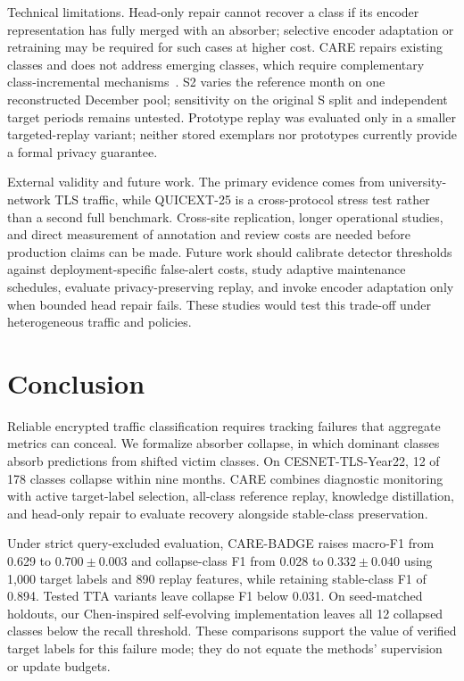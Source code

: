 \documentclass[preprint,12pt,authoryear]{elsarticle}
\let\cite\citep
\newcommand{\ours}{CARE}  %
\begin{document}
Technical limitations.
Head-only repair cannot recover a class if its encoder representation has fully merged with an absorber; selective encoder adaptation or retraining may be required for such cases at higher cost. \ours{} repairs existing classes and does not address emerging classes, which require complementary class-incremental mechanisms~\cite{cai2024cpn}. S2 varies the reference month on one reconstructed December pool; sensitivity on the original S split and independent target periods remains untested. Prototype replay was evaluated only in a smaller targeted-replay variant; neither stored exemplars nor prototypes currently provide a formal privacy guarantee.

External validity and future work.
The primary evidence comes from university-network TLS traffic, while QUICEXT-25 is a cross-protocol stress test rather than a second full benchmark. Cross-site replication, longer operational studies, and direct measurement of annotation and review costs are needed before production claims can be made. Future work should calibrate detector thresholds against deployment-specific false-alert costs, study adaptive maintenance schedules, evaluate privacy-preserving replay, and invoke encoder adaptation only when bounded head repair fails. These studies would test this trade-off under heterogeneous traffic and policies.


\section{Conclusion}
\label{sec:conclusion}

Reliable encrypted traffic classification requires tracking failures that aggregate metrics can conceal. We formalize absorber collapse, in which dominant classes absorb predictions from shifted victim classes. On CESNET-TLS-Year22, 12 of 178 classes collapse within nine months. \ours{} combines diagnostic monitoring with active target-label selection, all-class reference replay, knowledge distillation, and head-only repair to evaluate recovery alongside stable-class preservation.

Under strict query-excluded evaluation, \ours{}-BADGE raises macro-F1 from 0.629 to $0.700{\pm}0.003$ and collapse-class F1 from 0.028 to $0.332{\pm}0.040$ using 1{,}000 target labels and 890 replay features, while retaining stable-class F1 of 0.894. Tested TTA variants leave collapse F1 below 0.031. On seed-matched holdouts, our Chen-inspired self-evolving implementation leaves all 12 collapsed classes below the recall threshold. These comparisons support the value of verified target labels for this failure mode; they do not equate the methods' supervision or update budgets.
\end{document}
